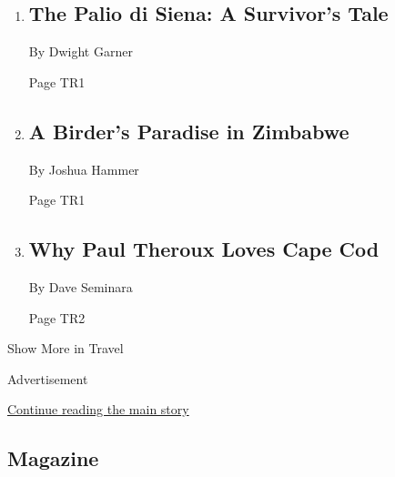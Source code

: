 \begin{enumerate}
\def\labelenumi{\arabic{enumi}.}
\item
  \href{/2018/04/16/travel/siena-italy-palio-di-siena.html}{}

  \hypertarget{the-palio-di-siena-a-survivors-tale}{%
  \subsection{The Palio di Siena: A Survivor's
  Tale}\label{the-palio-di-siena-a-survivors-tale}}

  By Dwight Garner

  Page TR1
\item
  \href{/2018/04/18/travel/zimbabwe-birds.html}{}

  \hypertarget{a-birders-paradise-in-zimbabwe}{%
  \subsection{A Birder's Paradise in
  Zimbabwe}\label{a-birders-paradise-in-zimbabwe}}

  By Joshua Hammer

  Page TR1
\item
  \href{/2018/04/16/travel/paul-theroux-cape-cod.html}{}

  \hypertarget{why-paul-theroux-loves-cape-cod}{%
  \subsection{Why Paul Theroux Loves Cape
  Cod}\label{why-paul-theroux-loves-cape-cod}}

  By Dave Seminara

  Page TR2
\end{enumerate}

Show More in Travel

Advertisement

\protect\hyperlink{after-mid5}{Continue reading the main story}

\hypertarget{magazine}{%
\subsection{Magazine}\label{magazine}}

